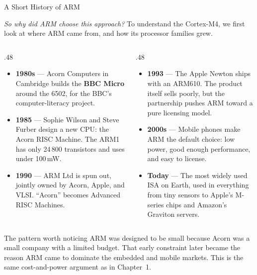 \documentclass[9pt,aspectratio=169,xcolor=table]{beamer}
\begin{document}
\begin{frame}{A Short History of ARM}
    {\small\centering\emph{So why did ARM choose this approach?} To understand the Cortex-M4, we first look at where ARM came from, and how its processor families grew.\par}
    \vspace{2mm}
    \begin{columns}[T]
    \begin{column}{.48\textwidth}
        \begin{itemize}
            \item \textbf{1980s} --- Acorn Computers in Cambridge builds the \textbf{BBC Micro} around the 6502, for the BBC's computer-literacy project.
            \item \textbf{1985} --- Sophie Wilson and Steve Furber design a new CPU: the \alert{Acorn RISC Machine}. The ARM1 has only 24\,800 transistors and uses under 100\,mW.
            \item \textbf{1990} --- ARM Ltd is spun out, jointly owned by Acorn, Apple, and VLSI. ``Acorn'' becomes \alert{Advanced RISC Machines}.
        \end{itemize}
    \end{column}
    \begin{column}{.48\textwidth}
        \begin{itemize}
            \item \textbf{1993} --- The Apple Newton ships with an ARM610. The product itself sells poorly, but the partnership pushes ARM toward a pure licensing model.
            \item \textbf{2000s} --- Mobile phones make ARM the default choice: low power, good enough performance, and easy to license.
            \item \textbf{Today} --- The most widely used ISA on Earth, used in everything from tiny sensors to Apple's M-series chips and Amazon's Graviton servers.
        \end{itemize}
    \end{column}
    \end{columns}
    \vspace{2mm}
    \begin{block}{The pattern worth noticing}
        ARM was designed to be small because Acorn was a small company with a limited budget. That early constraint later became the reason ARM came to dominate the embedded and mobile markets. This is the same cost-and-power argument as in Chapter~1.
    \end{block}
\end{frame}
\end{document}
